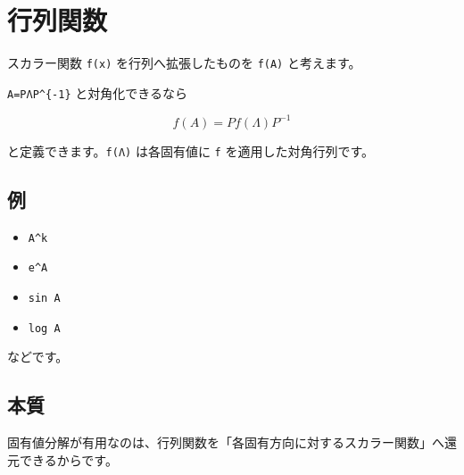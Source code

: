 \documentclass[
  11pt,
  a4paper,
]{ltjsarticle}
\author{}
\date{}
\providecommand{\tightlist}{%
  \setlength{\itemsep}{0pt}\setlength{\parskip}{0pt}}
\begin{document}
\hypertarget{ux884cux5217ux95a2ux6570}{%
\section{行列関数}\label{ux884cux5217ux95a2ux6570}}

スカラー関数 \texttt{f(x)} を行列へ拡張したものを \texttt{f(A)}
と考えます。

\texttt{A=PΛP\^{}\{-1\}} と対角化できるなら

\[
f(A)=Pf(\Lambda)P^{-1}
\]

と定義できます。\texttt{f(Λ)} は各固有値に \texttt{f}
を適用した対角行列です。

\hypertarget{ux4f8b}{%
\subsection{例}\label{ux4f8b}}

\begin{itemize}
\tightlist
\item
  \texttt{A\^{}k}
\item
  \texttt{e\^{}A}
\item
  \texttt{sin\ A}
\item
  \texttt{log\ A}
\end{itemize}

などです。

\hypertarget{ux672cux8cea}{%
\subsection{本質}\label{ux672cux8cea}}

固有値分解が有用なのは、行列関数を「各固有方向に対するスカラー関数」へ還元できるからです。
\end{document}
